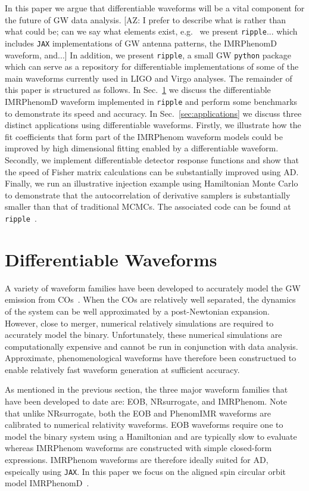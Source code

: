 \documentclass[twocolumn]{aastex631}
\newcommand{\jax}{\texttt{JAX}\xspace}
\newcommand{\ripple}{\texttt{ripple}\xspace}
\newcommand{\AZ}[1]{{\color{Burnt}[AZ: #1]}}
\begin{document}
In this paper we argue that differentiable waveforms will be a vital component for the future of GW data analysis.
\AZ{I prefer to describe what is rather than what could be; can we say what elements exist, e.g.~
we present \ripple... which includes \jax implementations of GW antenna patterns, the IMRPhenomD waveform, and...}
In addition, we present \ripple, a small GW \texttt{python} package which can serve as a repository for differentiable implementations of some of the main waveforms currently used in LIGO and Virgo analyses. 
The remainder of this paper is structured as follows. 
In Sec.~\ref{sec:waveforms} we discuss the differentiable IMRPhenomD waveform implemented in \ripple and perform some benchmarks to demonstrate its speed and accuracy. 
In Sec.~\ref{sec:applications} we discuss three distinct applications using differentiable waveforms. 
Firstly, we illustrate how the fit coefficients that form part of the IMRPhenom waveform models could be improved by high dimensional fitting enabled by a differentiable waveform. 
Secondly, we implement differentiable detector response functions and show that the speed of Fisher matrix calculations can be substantially improved using AD.
Finally, we run an illustrative injection example using Hamiltonian Monte Carlo to demonstrate that the autocorrelation of derivative samplers is substantially smaller than that of traditional MCMCs.
The associated code can be found at \ripple~\citep{ripple}.

\section{Differentiable Waveforms}
\label{sec:waveforms}

A variety of waveform families have been developed to accurately model the GW emission from COs~\citep{Schmidtreview}. 
When the COs are relatively well separated, the dynamics of the system can be well approximated by a post-Newtonian expansion.
However, close to merger, numerical relatively simulations are required to accurately model the binary.
Unfortunately, these numerical simulations are computationally expensive and cannot be run in conjunction with data analysis.
Approximate, phenomenological waveforms have therefore been constructued to enable relatively fast waveform generation at sufficient accuracy.

As mentioned in the previous section, the three major waveform families that have been developed to date are:  EOB,  NRsurrogate, and IMRPhenom.
Note that unlike NRsurrogate, both the EOB and PhenomIMR waveforms are calibrated to numerical relativity waveforms.
EOB waveforms require one to model the binary system using a Hamiltonian and are typically slow to evaluate whereas IMRPhenom waveforms are constructed with simple closed-form expressions.
IMRPhenom waveforms are therefore ideally suited for AD, espeically using \jax. 
In this paper we focus on the aligned spin circular orbit model IMRPhenomD~\citep{Husa:2015iqa, Khan:2015jqa}.
\end{document}
